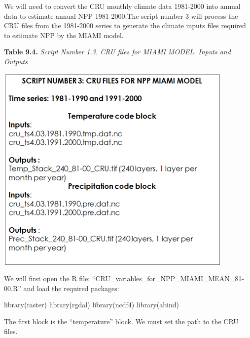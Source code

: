 \documentclass[
  10pt,
  b5paper,
]{book}
\newenvironment{Shaded}{\begin{snugshade}}{\end{snugshade}}
\newcommand{\FunctionTok}[1]{\textcolor[rgb]{0.00,0.00,0.00}{#1}}
\newcommand{\NormalTok}[1]{#1}
\begin{document}
We will need to convert the CRU monthly climate data 1981-2000 into annual data to estimate annual NPP 1981-2000.The script number 3 will process the CRU files from the 1981-2000 series to generate the climate inputs files required to estimate NPP by the MIAMI model.

\textbf{Table 9.4.} \emph{Script Number 1.3. CRU files for MIAMI MODEL. Inputs and Outputs}

\includegraphics{tables/Table_9.3.png}

We will first open the R file: ``CRU\_variables\_for\_NPP\_MIAMI\_MEAN\_81-00.R'' and load the required packages:

\begin{Shaded}
\begin{Highlighting}[]
\FunctionTok{library}\NormalTok{(raster)}
\FunctionTok{library}\NormalTok{(rgdal)}
\FunctionTok{library}\NormalTok{(ncdf4)}
\FunctionTok{library}\NormalTok{(abind)}
\end{Highlighting}
\end{Shaded}

The first block is the ``temperature'' block. We must set the path to the CRU files.
\end{document}
